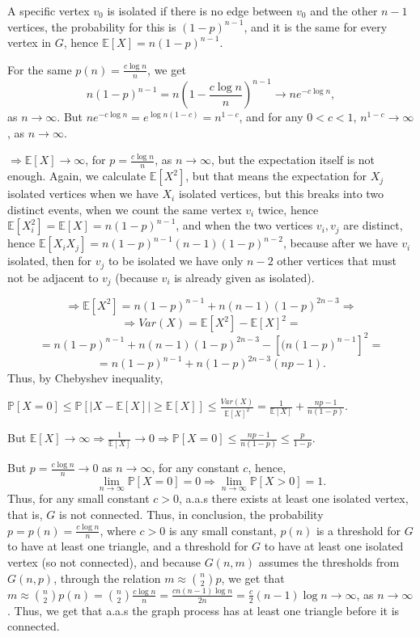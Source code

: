 \documentclass{article}
\begin{document}
A specific vertex $v_0$ is isolated if there is no edge between $v_0$ and the other $n-1$ vertices, the probability for this is $(1-p)^{n-1}$, and it is the same for every vertex in $G$, hence $\mathbb{E}[X]=n(1-p)^{n-1}$.

For the same $p(n)=\frac{c\log{n}}{n}$, we get 
\[n(1-p)^{n-1}=n(1-\frac{c\log{n}}{n})^{n-1}\rightarrow{n}e^{-c\log{n}},\]
as $n\rightarrow\infty$.
But $ne^{-c\log{n}}=e^{\log{n}(1-c)}=n^{1-c}$, and for any $0<{c}<1$, $n^{1-c}\rightarrow\infty$, as $n\rightarrow\infty$.

$\Rightarrow\mathbb{E}[X]\rightarrow\infty$, for $p=\frac{c\log{n}}{n}$, as $n\rightarrow\infty$, but the expectation itself is not enough. Again, we calculate $\mathbb{E}[X^2]$, but that means the expectation for $X_j$ isolated vertices when we have $X_i$ isolated vertices, but this breaks into two distinct events, when we count the same vertex $v_i$ twice, hence $\mathbb{E}[X_i^2]=\mathbb{E}[X]=n(1-p)^{n-1}$, and when the two vertices $v_i,v_j$ are distinct, hence $\mathbb{E}[X_iX_j]=n(1-p)^{n-1}(n-1)(1-p)^{n-2}$, because after we have $v_i$ isolated, then for $v_j$ to be isolated we have only $n-2$ other vertices that must not be adjacent to $v_j$ (because $v_i$ is already given as isolated).

\[\Rightarrow\mathbb{E}[X^2]=n(1-p)^{n-1}+n(n-1)(1-p)^{2n-3}\Rightarrow\]\[\Rightarrow{Var(X)=\mathbb{E}[X^2]-\mathbb{E}[X]^2}=\]\[=n(1-p)^{n-1}+n(n-1)(1-p)^{2n-3}-[(n(1-p)^{n-1}]^2=\]\[=n(1-p)^{n-1}+n(1-p)^{2n-3}(np-1).\]
Thus, by Chebyshev inequality,

$\mathbb{P}[X=0]\leq\mathbb{P}[|X-\mathbb{E}[X]|\geq\mathbb{E}[X]]\leq\frac{Var(X)}{\mathbb{E}[X]^2}=\frac{1}{\mathbb{E}[X]}+\frac{np-1}{n(1-p)}$. 

But $\mathbb{E}[X]\rightarrow\infty\Rightarrow\frac{1}{\mathbb{E}[X]}\rightarrow{0}\Rightarrow\mathbb{P}[X=0]\leq\frac{np-1}{n(1-p)}\leq\frac{p}{1-p}$.

But $p=\frac{c\log{n}}{n}\rightarrow{0}$ as $n\rightarrow\infty$, for any constant $c$, hence, 
\[\lim_{n\rightarrow\infty}\mathbb{P}[X=0]=0\Rightarrow\lim_{n\rightarrow\infty}\mathbb{P}[X>0]=1.\]
Thus, for any small constant $c>0$, a.a.s there exists at least one isolated vertex, that is, $G$ is not connected.
Thus, in conclusion, the probability $p=p(n)=\frac{c\log{n}}{n}$, where $c>0$ is any small constant, $p(n)$ is a threshold for $G$ to have at least one triangle, and a threshold for $G$ to have at least one isolated vertex (so not connected), and because $G(n,m)$ assumes the thresholds from $G(n,p)$, through the relation $m\approx\binom{n}{2}p$, we get that $m\approx\binom{n}{2}p(n)=\binom{n}{2}\frac{c\log{n}}{n}=\frac{cn(n-1)\log{n}}{2n}=\frac{c}{2}(n-1)\log{n}\rightarrow\infty$, as $n\rightarrow\infty$.
Thus, we get that a.a.s the graph process has at least one triangle before it is connected.
\end{document}
